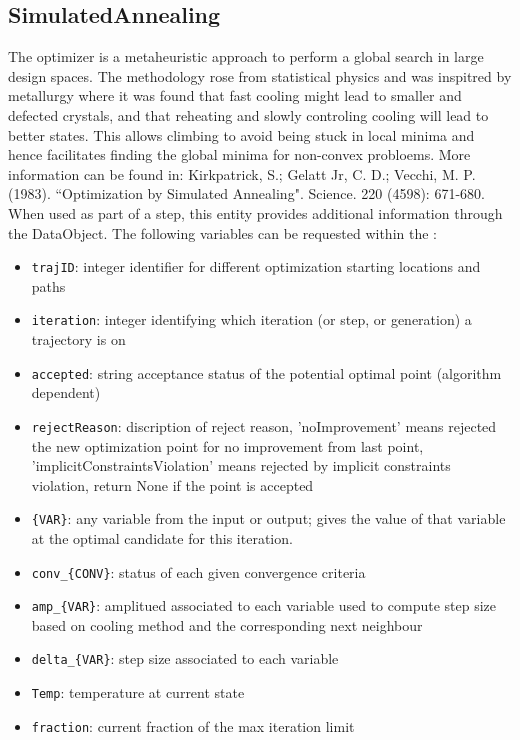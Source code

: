 \subsection{SimulatedAnnealing}
  The  optimizer is a metaheuristic approach
  to perform a global search in large design spaces. The methodology rose
  from statistical physics and was inspitred by metallurgy where                             it was
  found that fast cooling might lead to smaller and defected crystals,
  and that reheating and slowly controling cooling will lead to better states.
  This allows climbing to avoid being stuck in local minima and hence facilitates
  finding the global minima for non-convex probloems.                             More information
  can be found in: Kirkpatrick, S.; Gelatt Jr, C. D.; Vecchi, M. P. (1983).
  ``Optimization by Simulated Annealing". Science. 220 (4598): 671-680.
\vspace{7pt} \\When used as part of a  step, this entity provides
        additional information through the  DataObject. The
        following variables can be requested within the :
        \begin{itemize}
          \item \texttt{trajID}: integer identifier for different optimization starting locations and paths
             \item \texttt{iteration}: integer identifying which iteration (or step, or generation) a trajectory is on
             \item \texttt{accepted}: string acceptance status of the potential optimal point (algorithm dependent)
             \item \texttt{rejectReason}: discription of reject reason, 'noImprovement' means rejected the new optimization point for no improvement from last point, 'implicitConstraintsViolation' means rejected by implicit constraints violation, return None if the point is accepted
             \item \texttt{\{VAR\}}: any variable from the  input or output; gives the value of that variable at the optimal candidate for this iteration.
             \item \texttt{conv\_\{CONV\}}: status of each given convergence criteria
             \item \texttt{amp\_\{VAR\}}: amplitued associated to each variable used to compute step size based on cooling method and the corresponding next neighbour
             \item \texttt{delta\_\{VAR\}}: step size associated to each variable
             \item \texttt{Temp}: temperature at current state
             \item \texttt{fraction}: current fraction of the max iteration limit
           
         \end{itemize}

